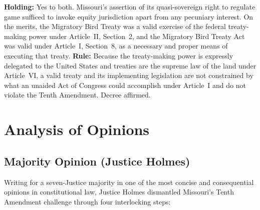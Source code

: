 \documentclass[12pt]{article}
\begin{document}
\textbf{Holding:} Yes to both. Missouri's assertion of its quasi-sovereign right to regulate game sufficed to invoke equity jurisdiction apart from any pecuniary interest. On the merits, the Migratory Bird Treaty was a valid exercise of the federal treaty-making power under Article~II, Section~2, and the Migratory Bird Treaty Act was valid under Article~I, Section~8, as a necessary and proper means of executing that treaty. \textbf{Rule:} Because the treaty-making power is expressly delegated to the United States and treaties are the supreme law of the land under Article~VI, a valid treaty and its implementing legislation are not constrained by what an unaided Act of Congress could accomplish under Article~I and do not violate the Tenth Amendment. Decree affirmed.

\section{Analysis of Opinions}
\subsection{Majority Opinion (Justice Holmes)}

Writing for a seven-Justice majority in one of the most concise and consequential opinions in constitutional law, Justice Holmes dismantled Missouri's Tenth Amendment challenge through four interlocking steps:
\end{document}
